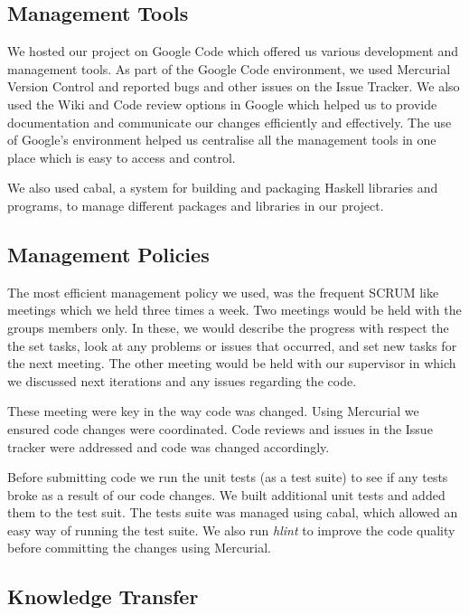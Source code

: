 \subsection*{Management Tools}

We hosted our project on Google Code which offered us various development and management tools. As part of the Google Code environment, we used Mercurial Version Control and reported bugs and other issues on the Issue Tracker. We also used the Wiki and Code review options in Google which helped us to provide documentation and communicate our changes efficiently and effectively. The use of Google's environment helped us centralise all the management tools in one place which is easy to access and control.

We also used cabal, a system for building and packaging Haskell libraries and programs, to manage different packages and libraries in our project. 

\subsection*{Management Policies}

The most efficient management policy we used, was the frequent SCRUM like meetings which we held three times a week. Two meetings would be held with the groups members only. In these, we would describe the progress with respect the the set tasks, look at any problems or issues that occurred, and set new tasks for the next meeting. The other meeting would be held with our supervisor in which we discussed next iterations and any issues regarding the code. 

These meeting were key in the way code was changed. Using Mercurial we ensured code changes were coordinated. Code reviews and issues in the Issue tracker were addressed and code was changed accordingly. 

Before submitting code we run the unit tests (as a test suite) to see if any tests broke as a result of our code changes. We built additional unit tests and added them to the test suit. The tests suite was managed using cabal, which allowed an easy way of running the test suite. We also run \emph{hlint} to improve the code quality before committing the changes using Mercurial. 

\subsection*{Knowledge Transfer}

